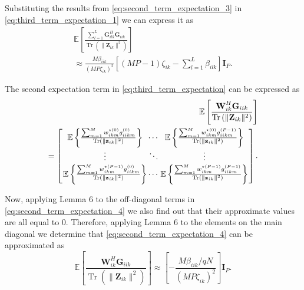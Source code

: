 \documentclass[10pt,journal,comsoc,final]{IEEEtran}
\DeclareMathOperator{\Tr}{Tr}
\begin{document}
Substituting the results from \eqref{eq:second_term_expectation_3} in \eqref{eq:third_term_expectation_1} we can express it as
\begin{equation}\label{eq:second_term_expectation_6}
\begin{split}
\mathbb{E} \left[ \frac{\sum_{l=1}^{L} \textbf{G}_{ilk}^{H} \textbf{G}_{iik}}{\Tr \left( \lVert \textbf{Z}_{ik} \rVert^{2} \right)} \right] \\ \approx \frac{M \beta_{iik}}{(MP \zeta_{ik})^{2}} \left[ (MP-1) \zeta_{ik} - \sum_{l=1}^{L}{\beta_{ilk}} \right] \textbf{I}_{P}.
\end{split}
\end{equation}

The second expectation term in \eqref{eq:third_term_expectation} can be expressed as
\begin{equation}\label{eq:second_term_expectation_4}
\begin{split}
\mathbb{E} \left[ \frac{\textbf{W}_{ik}^{H} \textbf{G}_{iik}}{\Tr \left( \lVert \textbf{Z}_{ik} \rVert^{2} \right)} \right] \\ = \arraycolsep=0.8pt\def\arraystretch{1.5}
\left[\begin{array}{ccc} \mathbb{E} \left\lbrace \frac{\sum_{m=1}^{M} w_{ikm}^{\star (0)} g_{iikm}^{(0)} }{\Tr \left( \lVert \textbf{z}_{ik} \rVert^{2} \right)} \right\rbrace & \cdots & \mathbb{E} \left\lbrace \frac{\sum_{m=1}^{M} w_{ikm}^{\star (0)}g_{iikm}^{(P-1)} }{\Tr \left( \lVert \textbf{z}_{ik} \rVert^{2} \right)} \right\rbrace \\
\vdots & \ddots & \vdots \\
\mathbb{E} \left\lbrace \frac{\sum_{m=1}^{M} w_{ikm}^{\star(P-1)}g_{iikm}^{(0)} }{\Tr \left( \lVert \textbf{z}_{ik} \rVert^{2} \right)}\right\rbrace & \cdots & \mathbb{E} \left\lbrace \frac{\sum_{m=1}^{M} w_{ikm}^{\star (P-1)}g_{iikm}^{(P-1)} }{\Tr \left( \lVert \textbf{z}_{ik} \rVert^{2} \right)} \right\rbrace
\end{array} \right].
\end{split}
\end{equation}

Now, applying Lemma 6 to the off-diagonal terms in \eqref{eq:second_term_expectation_4} we also find out that their approximate values are all equal to 0. Therefore, applying Lemma 6 to the elements on the main diagonal we determine that \eqref{eq:second_term_expectation_4} can be approximated as
\begin{equation}\label{eq:second_term_expectation_5}
\mathbb{E} \left[ \frac{\textbf{W}_{ik}^{H} \textbf{G}_{iik}}{\Tr \left( \lVert \textbf{Z}_{ik} \rVert^{2} \right)} \right] \approx \left[ -\frac{M \beta_{iik} / qN}{(MP \zeta_{ik})^{2}} \right] \textbf{I}_{P}.
\end{equation}
\end{document}
